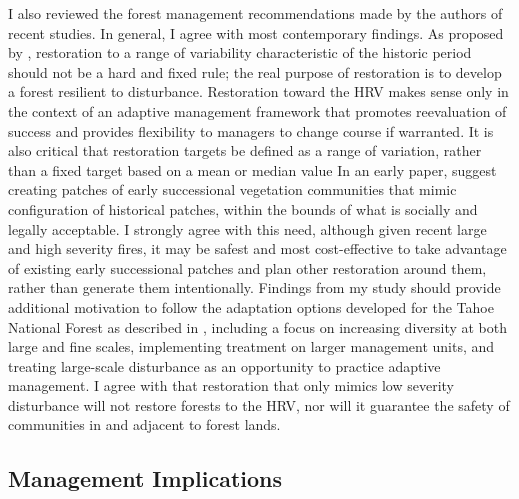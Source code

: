 I also reviewed the forest management recommendations made by the authors of recent studies. In general, I agree with most contemporary findings. As proposed by \citet{Collins2011}, restoration to a range of variability characteristic of the historic period should not be a hard and fixed rule; the real purpose of restoration is to develop a forest resilient to disturbance. Restoration toward the HRV makes sense only in the context of an adaptive management framework that promotes reevaluation of success and provides flexibility to managers to change course if warranted. It is also critical that restoration targets be defined as a range of variation, rather than a fixed target based on a mean or median value \citep{Collins2011} In an early paper, \citet{Collins2010} suggest creating patches of early successional vegetation communities that mimic configuration of historical patches, within the bounds of what is socially and legally acceptable. I strongly agree with this need, although given recent large and high severity fires, it may be safest and most cost-effective to take advantage of existing early successional patches and plan other restoration around them, rather than generate them intentionally. Findings from my study should provide additional motivation to follow the adaptation options developed for the Tahoe National Forest as described in \citet{Littell2012}, including a focus on increasing diversity at both large and fine scales, implementing treatment on larger management units, and treating large-scale disturbance as an opportunity to practice adaptive management. I agree with \citet{Baker2012} that restoration that only mimics low severity disturbance will not restore forests to the HRV, nor will it guarantee the safety of communities in and adjacent to forest lands.


\clearpage
\subsection{Management Implications}


